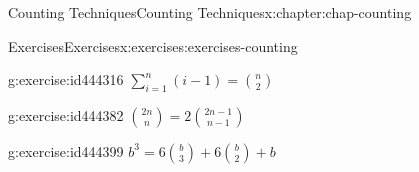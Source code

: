 \documentclass[oneside,10pt,]{book}
\numberwithin{equation}{section}
\begin{document}
\begin{chapterptx}{Counting Techniques}{}{Counting Techniques}{}{}{x:chapter:chap-counting}
\begin{exercises-section}{Exercises}{}{Exercises}{}{}{x:exercises:exercises-counting}
\begin{exercisegroup}
\begin{divisionexerciseeg}{26}{}{}{g:exercise:id444316}%
\(\displaystyle\sum_{i=1}^n (i-1) = \binom{n}{2}\)%
\end{divisionexerciseeg}%
\begin{divisionexerciseeg}{27}{}{}{g:exercise:id444382}%
\(\displaystyle\binom{2n}{n} = 2\binom{2n-1}{n-1}\)%
\end{divisionexerciseeg}%
\begin{divisionexerciseeg}{28}{}{}{g:exercise:id444399}%
\(\displaystyle b^3 = 6\binom{b}{3} + 6\binom{b}{2} + b\)%
\end{divisionexerciseeg}%
\end{exercisegroup}
\par\medskip\noindent
\end{exercises-section}
\end{chapterptx}
%
%
\typeout{************************************************}
\typeout{************************************************}
%
\end{document}
